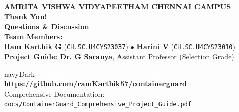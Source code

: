 \documentclass[aspectratio=169,10pt]{beamer}
\begin{document}
{
\begin{frame}[plain]
  \vspace{0.8cm}
  \begin{center}
    {\fontsize{10pt}{12pt}\selectfont \textbf{\textcolor{crimsonDark}{AMRITA VISHWA VIDYAPEETHAM \quad \textbar \quad CHENNAI CAMPUS}}}\\[0.2cm]
    {\fontsize{22pt}{24pt}\selectfont \textbf{\textcolor{blueBrand}{Thank You!}}}\\[0.3cm]
    {\fontsize{13pt}{15pt}\selectfont \textbf{\textcolor{navyDark}{Questions \& Discussion}}}\\[0.4cm]

    \small
    \textbf{Team Members:}\\[0.05cm]
    \textbf{Ram Karthik G} (\texttt{CH.SC.U4CYS23037}) \quad $\bullet$ \quad \textbf{Harini V} (\texttt{CH.SC.U4CYS23010})\\[0.15cm]
    \textbf{Project Guide:} \textbf{Dr. G Saranya}, Assistant Professor (Selection Grade)
  \end{center}

  \vspace{0.4cm}
  \begin{center}
    \begin{beamercolorbox}[wd=0.85\textwidth,rounded=true,shadow=false]{navyDark}
      \centering
      \vspace{0.15cm}
      \small \textbf{\textcolor{white}{ContainerGuard Open-Source Repository:}}\\
      \small \textcolor{blueAccent}{\textbf{https://github.com/ramKarthik57/containerguard}}\\[0.1cm]
      \footnotesize \textcolor{gray!40}{Comprehensive Documentation: \texttt{docs/ContainerGuard\_Comprehensive\_Project\_Guide.pdf}}
      \vspace{0.15cm}
    \end{beamercolorbox}
  \end{center}
\end{frame}
}
\end{document}
